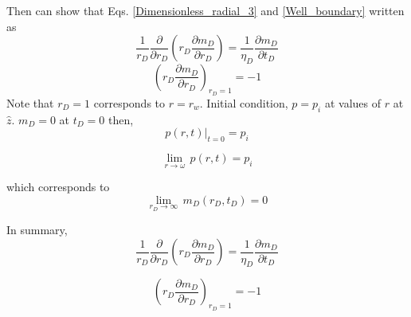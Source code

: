 \documentclass{llncs}
\numberwithin{equation}{section}
\numberwithin{figure}{section}
\numberwithin{table}{section}
\begin{document}
    Then  can show that Eqs. \ref{Dimensionless_radial_3} and \ref{Well_boundary} written as
    \begin{equation}
            \frac{1}{{{r}_{D}}}\frac{\partial }{\partial {{r}_{D}}}\left( {{r}_{D}}\frac{\partial {{m}_{D}}}{\partial {{r}_{D}}} \right)=\frac{1}{{{\eta }_{D}}}\frac{\partial {{m}_{D}}}{\partial {{t}_{D}}}
        \label{Dimensionless_radial_4}
    \end{equation}        
    \begin{equation}
            {{\left( {{r}_{D}}\frac{\partial {{m}_{D}}}{\partial {{r}_{D}}} \right)}_{{{r}_{D}}=1}}=-1
        \label{Well_boundary_2}
    \end{equation}        
    Note that $r_{D}=1$ corresponds to $r=r_{w}$.
    Initial condition, $p=p_{i}$ at values of $r$ at $\widehat{z}$. 
    $m_{D}=0$ at $t_{D}=0$ then,
    \begin{equation}
        {{\left. p\left( r,t \right) \right|}_{t=0}}={{p}_{i}}    
        \label{initial_condition}
    \end{equation}       
    
    \begin{equation*}
        \underset{r\to \omega }{\mathop{\lim }}\,p\left( r,t \right)={{p}_{i}}
    \end{equation*}
    
    which corresponds to
    \begin{equation}
        \underset{{{r}_{D}}\to \infty }{\mathop{\lim }}\,{{m}_{D}}\left( {{r}_{D}},{{t}_{D}} \right)=0
        \label{initial_condition_md}
    \end{equation}    
    
    In summary, 
    \begin{equation}
        \frac{1}{{{r}_{D}}}\frac{\partial }{\partial {{r}_{D}}}\left( {{r}_{D}}\frac{\partial {{m}_{D}}}{\partial {{r}_{D}}} \right)=\frac{1}{{{\eta }_{D}}}\frac{\partial {{m}_{D}}}{\partial {{t}_{D}}}
        \label{Dimensionless_radial_md_Sum}
    \end{equation}      
    
    \begin{equation}
        {{\left( {{r}_{D}}\frac{\partial {{m}_{D}}}{\partial {{r}_{D}}} \right)}_{{{r}_{D}}=1}}=-1
        \label{Boundary_1_sum}
    \end{equation}     
    
\end{document}
